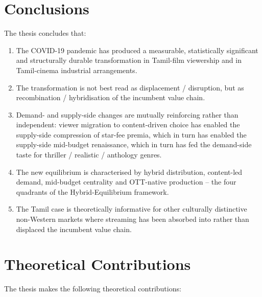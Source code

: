 \section{Conclusions}
\label{sec:conclusions}

The thesis concludes that:

\begin{enumerate}[itemsep=2pt]
\item The COVID-19 pandemic has produced a measurable, statistically
      significant and structurally durable transformation in
      Tamil-film viewership and in Tamil-cinema industrial
      arrangements.
\item The transformation is not best read as displacement /
      disruption, but as recombination / hybridisation of the
      incumbent value chain.
\item Demand- and supply-side changes are mutually reinforcing
      rather than independent: viewer migration to content-driven
      choice has enabled the supply-side compression of star-fee
      premia, which in turn has enabled the supply-side
      mid-budget renaissance, which in turn has fed the demand-side
      taste for thriller / realistic / anthology genres.
\item The new equilibrium is characterised by hybrid distribution,
      content-led demand, mid-budget centrality and OTT-native
      production -- the four quadrants of the
      Hybrid-Equilibrium framework.
\item The Tamil case is theoretically informative for other
      culturally distinctive non-Western markets where streaming
      has been absorbed into rather than displaced the incumbent
      value chain.
\end{enumerate}

\section{Theoretical Contributions}
\label{sec:theoretical_contribution}

The thesis makes the following theoretical contributions:

